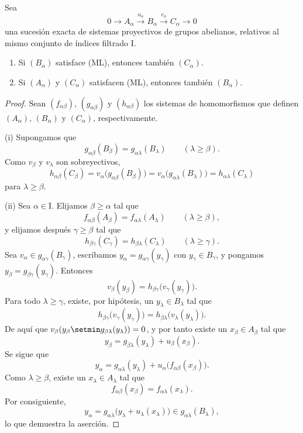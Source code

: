 \documentclass[oneside]{amsart}
\renewcommand{\geq}{\geqslant}
\newcommand{\oldpage}[2][]{{\marginnote{\normalfont\textbf{#1}~|~#2}}\ignorespaces}
\let\EGAOriginalLabel\label
\renewcommand{\label}[1]{\phantomsection\EGAOriginalLabel{#1}}
\begin{document}
\begin{proposition}[13.2.1]
\label{0.13.2.1}
Sea
\[
  0\longrightarrow A_\alpha
  \xrightarrow{u_\alpha}B_\alpha
  \xrightarrow{v_\alpha}C_\alpha
  \longrightarrow0
\]
una sucesión exacta de sistemas proyectivos de grupos abelianos, relativos
al mismo conjunto de índices filtrado $\mathrm{I}$.
\begin{enumerate}
  \item[{\rm(i)}]
  Si $(B_\alpha)$ satisface {\rm(ML)}, entonces también $(C_\alpha)$.
  \item[{\rm(ii)}]
  Si $(A_\alpha)$ y $(C_\alpha)$ satisfacen {\rm(ML)}, entonces también
  $(B_\alpha)$.
\end{enumerate}
\end{proposition}

\begin{proof}
Sean $(f_{\alpha\beta})$, $(g_{\alpha\beta})$ y
$(h_{\alpha\beta})$ los sistemas de homomorfismos que definen
$(A_\alpha)$, $(B_\alpha)$ y $(C_\alpha)$, respectivamente.

(i) Supongamos que
\[
  g_{\alpha\beta}(B_\beta)
  =
  g_{\alpha\lambda}(B_\lambda)
  \qquad(\lambda\geq\beta).
\]
Como $v_\beta$ y $v_\lambda$ son sobreyectivos,
\[
  h_{\alpha\beta}(C_\beta)
  =
  v_\alpha\bigl(g_{\alpha\beta}(B_\beta)\bigr)
  =
  v_\alpha\bigl(g_{\alpha\lambda}(B_\lambda)\bigr)
  =
  h_{\alpha\lambda}(C_\lambda)
\]
para $\lambda\geq\beta$.

(ii) Sea $\alpha\in\mathrm{I}$.
Elijamos $\beta\geq\alpha$ tal que
\[
  f_{\alpha\beta}(A_\beta)
  =
  f_{\alpha\lambda}(A_\lambda)
  \qquad(\lambda\geq\beta),
\]
y elijamos después $\gamma\geq\beta$ tal que
\[
  h_{\beta\gamma}(C_\gamma)
  =
  h_{\beta\lambda}(C_\lambda)
  \qquad(\lambda\geq\gamma).
\]
Sea $v_\alpha\in g_{\alpha\gamma}(B_\gamma)$, escribamos
$y_\alpha=g_{\alpha\gamma}(y_\gamma)$ con $y_\gamma\in B_\gamma$,
y pongamos $y_\beta=g_{\beta\gamma}(y_\gamma)$.
Entonces
\[
  v_\beta(y_\beta)
  =
  h_{\beta\gamma}\bigl(v_\gamma(y_\gamma)\bigr).
\]
Para todo $\lambda\geq\gamma$, existe, por hipótesis, un
$y_\lambda\in B_\lambda$ tal que
\[
  h_{\beta\gamma}\bigl(v_\gamma(y_\gamma)\bigr)
  =
  h_{\beta\lambda}\bigl(v_\lambda(y_\lambda)\bigr).
\]
De aquí que
$v_\beta(y_\beta\setmin g_{\beta\lambda}(y_\lambda))=0$, y por tanto
existe un $x_\beta\in A_\beta$
\oldpage[0\textsubscript{III}]{66}
tal que
\[
  y_\beta
  =
  g_{\beta\lambda}(y_\lambda)+u_\beta(x_\beta).
\]
Se sigue que
\[
  y_\alpha
  =
  g_{\alpha\lambda}(y_\lambda)
  +
  u_\alpha\bigl(f_{\alpha\beta}(x_\beta)\bigr).
\]
Como $\lambda\geq\beta$, existe un $x_\lambda\in A_\lambda$ tal
que
\[
  f_{\alpha\beta}(x_\beta)=f_{\alpha\lambda}(x_\lambda).
\]
Por consiguiente,
\[
  y_\alpha
  =
  g_{\alpha\lambda}
  \bigl(y_\lambda+u_\lambda(x_\lambda)\bigr)
  \in g_{\alpha\lambda}(B_\lambda),
\]
lo que demuestra la aserción.
\end{proof}
\end{document}
